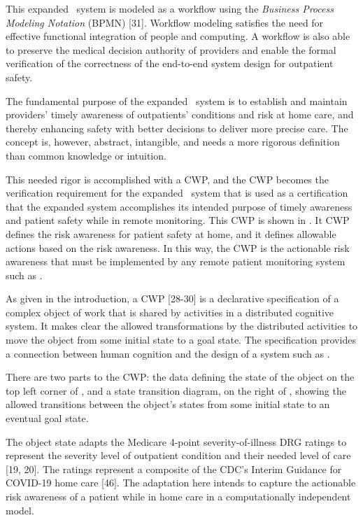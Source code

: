This expanded \phware\ system is modeled as a workflow using the \emph{Business Process Modeling Notation} (BPMN) [31]. Workflow modeling satisfies the need for effective functional integration of people and computing. A workflow is also able to preserve the medical decision authority of providers and enable the formal verification of the correctness of the end-to-end system design for outpatient safety.

The fundamental purpose of the expanded \phware\ system is to establish and maintain providers' timely awareness of outpatients' conditions and risk at home care, and thereby enhancing safety with better decisions to deliver more precise care. The concept is, however, abstract, intangible, and needs a more rigorous definition than common knowledge or intuition. 

This needed rigor is accomplished with a CWP, and the CWP becomes the verification requirement for the expanded \phware\ system that is used as a certification that the expanded system accomplishes its intended purpose of timely awareness and patient safety while in remote monitoring. This CWP is shown in . It CWP defines the risk awareness for patient safety at home, and it defines allowable actions based on the risk awareness. In this way, the CWP is the actionable risk awareness that must be implemented by any remote patient monitoring system such as \phware. 

As given in the introduction, a CWP [28-30] is a declarative specification of a complex object of work that is shared by activities in a distributed cognitive system. It makes clear the allowed transformations by the distributed activities to move the object from some initial state to a goal state. The specification provides a connection between human cognition and the design of a system such as \phware.

There are two parts to the CWP: the data defining the state of the object on the top left corner of , and a state transition diagram, on the right of , showing the allowed transitions between the object's states from some initial state to an eventual goal state. 

The object state adapts the Medicare 4-point severity-of-illness DRG ratings to represent the severity level of outpatient condition and their needed level of care [19, 20]. The ratings represent a composite of the CDC’s Interim Guidance for COVID-19 home care [46]. The adaptation here intends to capture the actionable risk awareness of a patient while in home care in a computationally independent model. 

